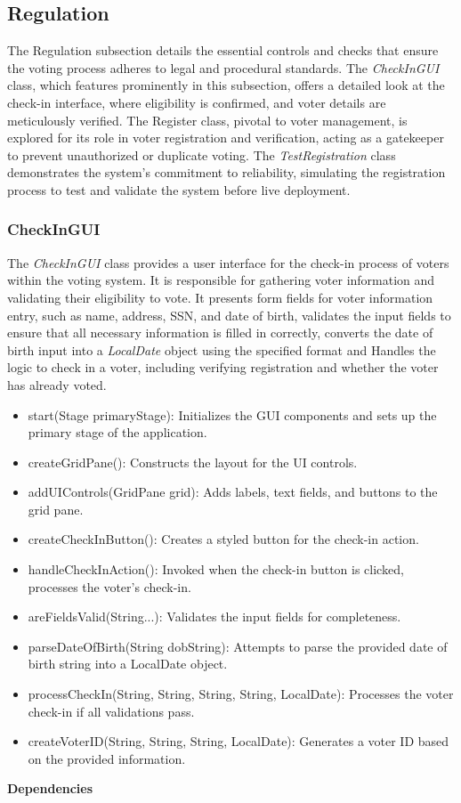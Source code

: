 \documentclass{article}
\begin{document}
\subsection{Regulation}
The Regulation subsection details the essential controls and checks that ensure the voting process adheres to legal and procedural standards. The \textit{CheckInGUI} class, which features prominently in this subsection, offers a detailed look at the check-in interface, where eligibility is confirmed, and voter details are meticulously verified. The Register class, pivotal to voter management, is explored for its role in voter registration and verification, acting as a gatekeeper to prevent unauthorized or duplicate voting. The \textit{TestRegistration} class demonstrates the system’s commitment to reliability, simulating the registration process to test and validate the system before live deployment.

\subsubsection{CheckInGUI}
The \textit{CheckInGUI} class provides a user interface for the check-in process of voters within the voting system. It is responsible for gathering voter information and validating their eligibility to vote.
It presents form fields for voter information entry, such as name, address, SSN, and date of birth, validates the input fields to ensure that all necessary information is filled in correctly, converts the date of birth input into a \textit{LocalDate} object using the specified format and  Handles the logic to check in a voter, including verifying registration and whether the voter has already voted.

\begin{itemize}
    \item start(Stage primaryStage): Initializes the GUI components and sets up the primary stage of the application.
    \item createGridPane(): Constructs the layout for the UI controls.
    \item addUIControls(GridPane grid): Adds labels, text fields, and buttons to the grid pane.
    \item createCheckInButton(): Creates a styled button for the check-in action.
    \item handleCheckInAction(): Invoked when the check-in button is clicked, processes the voter’s check-in.
    \item areFieldsValid(String...): Validates the input fields for completeness.
    \item parseDateOfBirth(String dobString): Attempts to parse the provided date of birth string into a LocalDate object.
    \item processCheckIn(String, String, String, String, LocalDate): Processes the voter check-in if all validations pass.
    \item createVoterID(String, String, String, LocalDate): Generates a voter ID based on the provided information.
\end{itemize}
\textbf{Dependencies}
\end{document}
